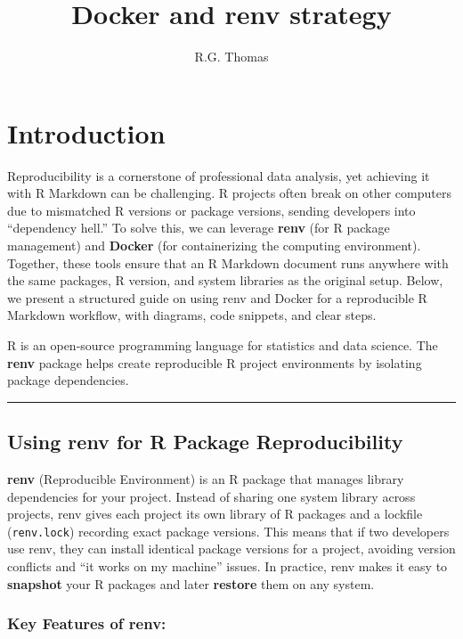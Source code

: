 \documentclass[
  11pt,
]{article}
\title{Docker and renv strategy}
\author{R.G. Thomas}
\date{}
\begin{document}
\maketitle

{
\hypersetup{linkcolor=}
\setcounter{tocdepth}{2}
\tableofcontents
}
\section{Introduction}\label{introduction}

Reproducibility is a cornerstone of professional data analysis, yet
achieving it with R Markdown can be challenging. R projects often break
on other computers due to mismatched R versions or package versions,
sending developers into ``dependency hell.'' To solve this, we can
leverage \textbf{renv} (for R package management) and \textbf{Docker}
(for containerizing the computing environment). Together, these tools
ensure that an R Markdown document runs anywhere with the same packages,
R version, and system libraries as the original setup. Below, we present
a structured guide on using renv and Docker for a reproducible R
Markdown workflow, with diagrams, code snippets, and clear steps.

R is an open-source programming language for statistics and data
science. The \textbf{renv} package helps create reproducible R project
environments by isolating package dependencies.

\begin{center}\rule{0.5\linewidth}{0.5pt}\end{center}

\subsection{Using renv for R Package
Reproducibility}\label{using-renv-for-r-package-reproducibility}

\textbf{renv} (Reproducible Environment) is an R package that manages
library dependencies for your project. Instead of sharing one system
library across projects, renv gives each project its own library of R
packages and a lockfile (\texttt{renv.lock}) recording exact package
versions. This means that if two developers use renv, they can install
identical package versions for a project, avoiding version conflicts and
``it works on my machine'' issues. In practice, renv makes it easy to
\textbf{snapshot} your R packages and later \textbf{restore} them on any
system.

\subsubsection{Key Features of renv:}\label{key-features-of-renv}
\end{document}
